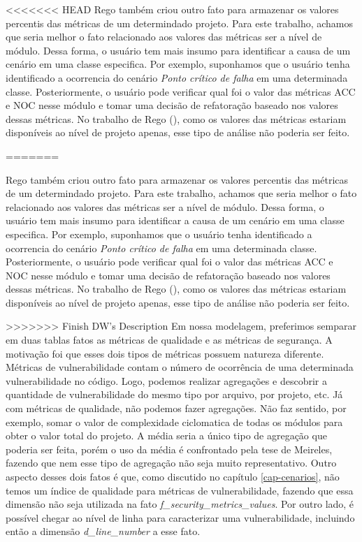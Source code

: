 <<<<<<< HEAD
Rego também criou outro fato para armazenar os valores percentis das métricas de um determindado projeto. Para este trabalho, achamos que seria melhor o fato relacionado aos valores das métricas ser a nível de módulo. Dessa forma, o usuário tem mais insumo para identificar a causa de um cenário em uma classe especifica. Por exemplo, suponhamos que o usuário tenha identificado a ocorrencia do cenário \emph{Ponto crítico de falha} em uma determinada classe. Posteriormente, o usuário pode verificar qual foi o valor das métricas ACC e NOC nesse módulo e tomar uma decisão de refatoração baseado nos valores dessas métricas. No trabalho de Rego (\citeyear{rego2014}), como os valores das métricas estariam disponíveis ao nível de projeto apenas, esse tipo de análise não poderia ser feito.

=======

Rego também criou outro fato para armazenar os valores percentis das métricas de um determindado projeto. Para este trabalho, achamos que seria melhor o fato relacionado aos valores das métricas ser a nível de módulo. Dessa forma, o usuário tem mais insumo para identificar a causa de um cenário em uma classe especifica. Por exemplo, suponhamos que o usuário tenha identificado a ocorrencia do cenário \emph{Ponto crítico de falha} em uma determinada classe. Posteriormente, o usuário pode verificar qual foi o valor das métricas ACC e NOC nesse módulo e tomar uma decisão de refatoração baseado nos valores dessas métricas. No trabalho de Rego (\citeyear{rego2014}), como os valores das métricas estariam disponíveis ao nível de projeto apenas, esse tipo de análise não poderia ser feito.

>>>>>>> Finish DW's Description
Em nossa modelagem, preferimos semparar em duas tablas fatos as métricas de qualidade e as métricas de segurança. A motivação foi que esses dois tipos de métricas possuem natureza diferente. Métricas de vulnerabilidade contam o número de ocorrência de uma determinada vulnerabilidade no código. Logo, podemos realizar agregações e descobrir a quantidade de vulnerabilidade do mesmo tipo por arquivo, por projeto, etc. Já com métricas de qualidade, não podemos fazer agregações. Não faz sentido, por exemplo, somar o valor de complexidade ciclomatica de todas os módulos para obter o valor total do projeto. A média seria a único tipo de agregação que poderia ser feita, porém o uso da média é confrontado pela tese de Meireles, fazendo que nem esse tipo de agregação não seja muito representativo. Outro aspecto desses dois fatos é que, como discutido no capítulo \ref{cap-cenarios}, não temos um índice de qualidade para métricas de vulnerabilidade, fazendo que essa dimensão não seja utilizada na fato \emph{f\_security\_metrics\_values}. Por outro lado, é possível chegar ao nível de linha para caracterizar uma vulnerabilidade, incluindo então a dimensão \emph{d\_line\_number} a esse fato.

